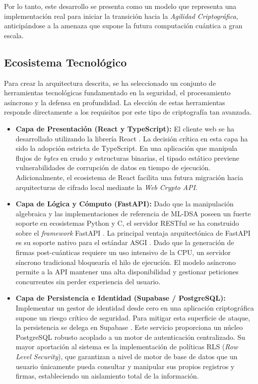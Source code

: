\documentclass[11pt, a4paper]{report}
\theoremstyle{definition}
\begin{document}
Por lo tanto, este desarrollo se presenta como un modelo que representa una implementación real para iniciar la transición hacia la \textit{Agilidad Criptográfica}, anticipándose a la amenaza que supone la futura computación cuántica a gran escala.


\subsection{Ecosistema Tecnológico}
\label{subsec:ecosistema_tecnologico}

Para crear la arquitectura descrita, se ha seleccionado un conjunto de herramientas tecnológicas fundamentado en la seguridad, el procesamiento asíncrono y la defensa en profundidad. La elección de estas herramientas responde directamente a los requisitos por este tipo de criptografía tan avanzada.

\begin{itemize}
    \item \textbf{Capa de Presentación (React y TypeScript):} El cliente web se ha desarrollado utilizando la librería React \cite{react_meta}. La decisión crítica en esta capa ha sido la adopción estricta de TypeScript. En una aplicación que manipula flujos de \textit{bytes} en crudo y estructuras binarias, el tipado estático previene vulnerabilidades de corrupción de datos en tiempo de ejecución. Adicionalmente, el ecosistema de React facilita una futura migración hacia arquitecturas de cifrado local mediante la \textit{Web Crypto API}.
    
    \item \textbf{Capa de Lógica y Cómputo (FastAPI):} Dado que la manipulación algebraica y las implementaciones de referencia de ML-DSA poseen un fuerte soporte en ecosistemas Python y C, el servidor RESTful se ha construido sobre el \textit{framework} FastAPI \cite{fastapi_ramirez}. La principal ventaja arquitectónica de FastAPI es su soporte nativo para el estándar ASGI \cite{asgi_spec}. Dado que la generación de firmas post-cuánticas requiere un uso intensivo de la CPU, un servidor síncrono tradicional bloquearía el hilo de ejecución. El modelo asíncrono permite a la API mantener una alta disponibilidad y gestionar peticiones concurrentes sin perder experiencia del usuario.
    
    \item \textbf{Capa de Persistencia e Identidad (Supabase / PostgreSQL):} Implementar un gestor de identidad desde cero en una aplicación criptográfica supone un riesgo crítico de seguridad. Para mitigar esta superficie de ataque, la persistencia se delega en Supabase \cite{supabase_docs}. Este servicio proporciona un núcleo PostgreSQL robusto acoplado a un motor de autenticación centralizado. Su mayor aportación al sistema es la implementación de políticas RLS (\textit{Row Level Security}), que garantizan a nivel de motor de base de datos que un usuario únicamente pueda consultar y manipular sus propios registros y firmas, estableciendo un aislamiento total de la información.
\end{itemize}
\end{document}
